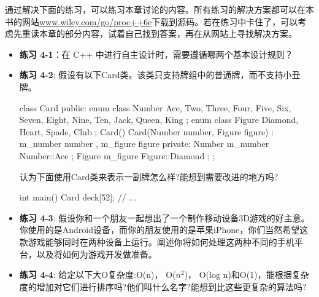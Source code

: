 通过解决下面的练习，可以练习本章讨论的内容。所有练习的解决方案都可以在本书的网站\url{www.wiley.com/go/proc++6e}下载到源码。若在练习中卡住了，可以考虑先重读本章的部分内容，试着自己找到答案，再在从网站上寻找解决方案。

\begin{itemize}
\item
\textbf{练习 4-1}：在 C++ 中进行自主设计时，需要遵循哪两个基本设计规则？

\item
\textbf{练习 4-2}: 假设有以下Card类。该类只支持牌组中的普通牌，而不支持小丑牌。

\begin{cpp}
class Card
{
    public:
        enum class Number { Ace, Two, Three, Four, Five, Six, Seven, Eight,
            Nine, Ten, Jack, Queen, King };
        enum class Figure { Diamond, Heart, Spade, Club };
        Card() {}
        Card(Number number, Figure figure)
        : m_number { number }, m_figure { figure } {}
    private:
        Number m_number { Number::Ace };
        Figure m_figure { Figure::Diamond };
};
\end{cpp}

认为下面使用Card类来表示一副牌怎么样?能想到需要改进的地方吗?

\begin{cpp}
int main()
{
    Card deck[52];
    // ...
}
\end{cpp}

\item
\textbf{练习 4-3}: 假设你和一个朋友一起想出了一个制作移动设备3D游戏的好主意。你使用的是Android设备，而你的朋友使用的是苹果iPhone，你们当然希望这款游戏能够同时在两种设备上运行。阐述你将如何处理这两种不同的手机平台，以及将如何为游戏开发做准备。

\item
\textbf{练习 4-4}: 给定以下大O复杂度:O(n)， O($n^2$)， O(log n)和O(1)，能根据复杂度的增加对它们进行排序吗?他们叫什么名字?能想到比这些更复杂的算法吗?
\end{itemize}








